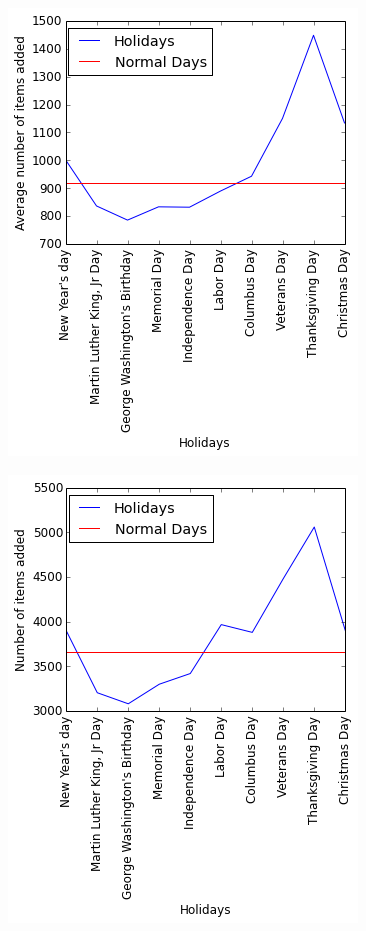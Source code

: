 \begin{figure}[!h]
\centering
\begin{minipage}{.25\textwidth}
  \centering
  \includegraphics[width=.9\linewidth]{alldif.png}
  \label{alldiffholiday}
\end{minipage}%
\begin{minipage}{.25\textwidth}
  \centering
  \includegraphics[width=.9\linewidth]{diff.png}

\end{minipage}
\end{figure}

